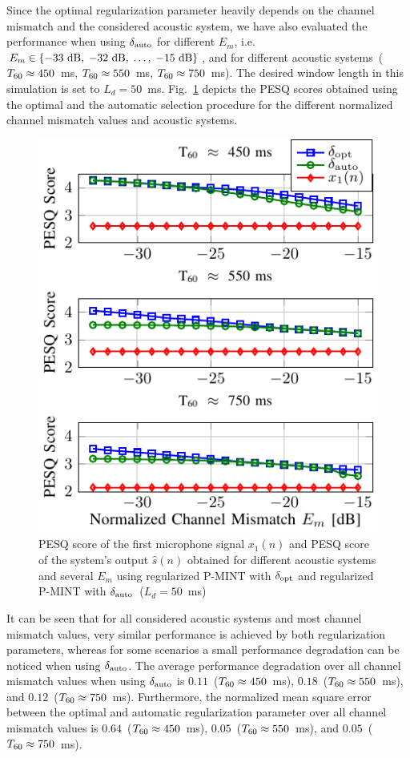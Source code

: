 \documentclass[10pt]{IEEEtran}
\begin{document}
Since the optimal regularization parameter heavily depends on the channel mismatch and the considered acoustic system, we have also evaluated the performance when using $\delta_{\rm auto}$ for different $E_m$, i.e. $E_m \in \{ -33~{\rm dB}, \; -32~{\rm dB}, \; \ldots, \; -15~{\rm dB} \}$, and for different acoustic systems~($T_{\rm 60} \approx 450$~ms, $T_{\rm 60} \approx 550$~ms, $T_{\rm 60} \approx 750$~ms).
The desired window length in this simulation is set to $L_d = 50$~ms.
Fig.~\ref{fig: autopesq2} depicts the PESQ scores obtained using the optimal and the automatic selection procedure for the different normalized channel mismatch values and acoustic systems.
\begin{figure}[t!]
  \centering
  \includegraphics[scale=0.9]{figures/auto_reg_Ld50_severalEm.pdf}
  \caption{PESQ score of the first microphone signal $x_1(n)$ and PESQ score of the system's output $\hat{s}(n)$ obtained for different acoustic systems and several $E_m$ using regularized P-MINT with $\delta_{\rm opt}$ and regularized P-MINT with $\delta_{\rm auto}$~($L_d = 50$~ms)}
  \label{fig: autopesq2}
\end{figure}
It can be seen that for all considered acoustic systems and most channel mismatch values, very similar performance is achieved by both regularization parameters, whereas for some scenarios a small performance degradation can be noticed when using $\delta_{\rm auto}$.
The average performance degradation over all channel mismatch values when using $\delta_{\rm auto}$ is $0.11$~($T_{\rm 60} \approx 450$~ms), $0.18$~($T_{\rm 60} \approx 550$~ms), and $0.12$~($T_{\rm 60} \approx 750$~ms).
Furthermore, the normalized mean square error between the optimal and automatic regularization parameter over all channel mismatch values is $0.64$~($T_{\rm 60} \approx 450$~ms), $0.05$~($T_{\rm 60} \approx 550$~ms), and $0.05$~($T_{\rm 60} \approx 750$~ms).
\end{document}
